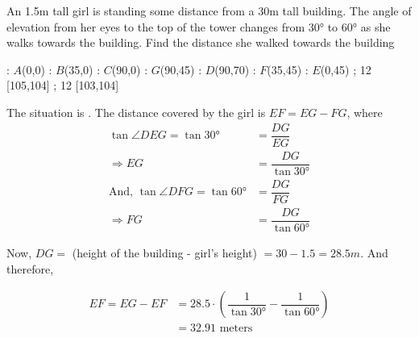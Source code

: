 
\question[3] An 1.5m tall girl is standing some distance from a 30m tall building.
The angle of elevation from her eyes to the top of the tower changes from $\ang{30}$
to $\ang{60}$ as she walks towards the building. Find the distance she walked towards the building


\ifprintanswers
  \begin{marginfigure}
      : $A$(0,0)
      : $B$(35,0)
      : $C$(90,0)
      : $G$(90,45)
      : $D$(90,70)
      : $F$(35,45)
      : $E$(0,45)
    \figdrawbegin{}
      \figdrawline [100,101,102,103,105,106,100]
      \figdrawline [101,105,104,106]
      \figdrawline [103,104]
       ; 12 [105,104] 
       ; 12 [103,104] 
    \figdrawend
    \centerline{\box\figBoxA}
  \end{marginfigure}
\fi 

\begin{solution}[\halfpage]
	The situation is \asif. The distance covered by the girl is $EF = EG - FG$, where
	\begin{align}
		\tan\angle{DEG} = \tan\ang{30} &= \dfrac{DG}{EG} \\
		\Rightarrow EG &= \dfrac{DG}{\tan\ang{30}} \\
		\text{And, }\tan\angle{DFG} = \tan\ang{60} &= \dfrac{DG}{FG} \\
		\Rightarrow FG &= \dfrac{DG}{\tan\ang{60}}
	\end{align}
	
	Now, $DG =$ (height of the building - girl's height) $= 30 - 1.5 = 28.5m$. And therefore, 
	
	\begin{align}
		EF = EG - EF &= 28.5\cdot\left(\dfrac{1}{\tan\ang{30}} - \dfrac{1}{\tan\ang{60}}\right) \\
		&= 32.91 \text{ meters}
	\end{align}
	
\end{solution}

